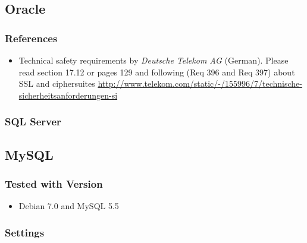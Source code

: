 
\subsection{Oracle}

\subsubsection{References}
\begin{itemize}
  \item Technical safety requirements by \emph{Deutsche Telekom AG} (German). Please read section 17.12 or pages 129 and following (Req 396 and Req 397) about SSL and ciphersuites \url{http://www.telekom.com/static/-/155996/7/technische-sicherheitsanforderungen-si}
\end{itemize}


\subsubsection{SQL Server}



\subsection{MySQL}
\subsubsection{Tested with Version}
\begin{itemize}
  \item Debian 7.0 and MySQL 5.5
\end{itemize}


\subsubsection{Settings}
